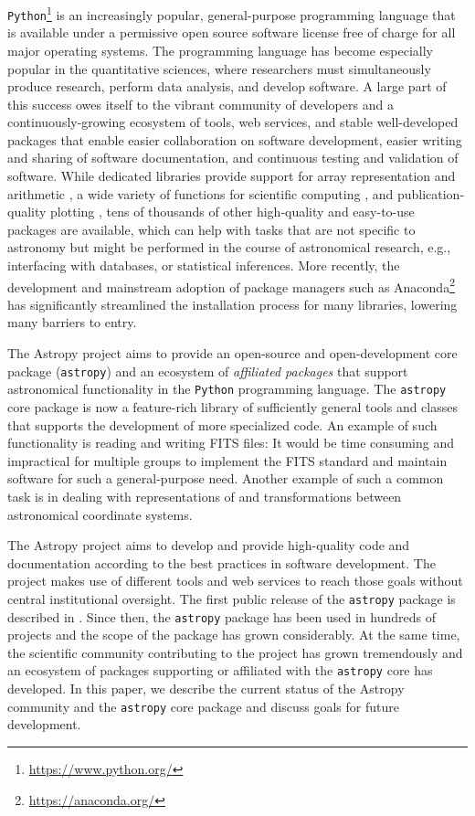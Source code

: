 \documentclass[modern]{aastex61}
\newcommand{\package}[1]{\texttt{#1}\xspace}
\newcommand{\python}{\package{Python}}
\newcommand{\astropy}{Astropy\xspace}
\newcommand{\astropypkg}{\package{astropy}}
\begin{document}
\python\footnote{\url{https://www.python.org/}} is an increasingly popular, general-purpose
programming language that is available under a permissive open source software license free of
charge for all major operating systems. The programming language has become especially popular
in the quantitative sciences, where researchers must simultaneously produce research, perform
data analysis, and develop software. A large part of this success owes itself to the vibrant
community of developers and a continuously-growing ecosystem of tools, web services, and stable
well-developed packages that enable easier collaboration on software development, easier
writing and sharing of software documentation, and continuous testing and validation of
software. While dedicated libraries provide support for array representation and
arithmetic \citep[\package{numpy};][]{numpy}, a wide variety of functions for scientific
computing \citep[\package{scipy};][]{scipy}, and publication-quality plotting
\citep[\package{matplotlib};][]{matplotlib}, tens of thousands of other high-quality and easy-to-use
packages are available, which can help with tasks that are not specific to astronomy but
might be performed in the course of astronomical research, e.g., interfacing with
databases, or statistical inferences.
More recently, the development and mainstream adoption of package managers such
as Anaconda\footnote{\url{https://anaconda.org/}} has significantly streamlined
the installation process for many libraries, lowering many barriers to entry.

The \astropy project aims to provide an open-source and open-development core
package (\astropypkg) and an ecosystem of \emph{affiliated packages} that
support astronomical functionality in the \python programming language.
The \astropypkg core package is now a feature-rich library of sufficiently
general tools and classes that supports the development of more specialized
code. An example of such functionality is reading and writing FITS files: It would be
time consuming and impractical for multiple groups to implement the FITS
standard \citep{FITS} and maintain software for such a general-purpose need.
Another example of such a common task is in dealing with representations of and
transformations between astronomical coordinate systems.

The \astropy project aims to develop and provide high-quality code and
documentation according to the best practices in software development.
The project makes use of different tools and web services to reach those
goals without central institutional oversight.
The first public release of the \astropypkg package is described in
\cite{astropy}. Since then, the \astropypkg package has been
used in hundreds of projects and the scope of the package has grown
considerably. At the same time, the scientific community
contributing to the project has grown tremendously and an ecosystem
of packages supporting or affiliated with the \astropypkg core has
developed.
In this paper, we describe the current status of the \astropy community and the
\astropypkg core package and discuss goals for future development.
\end{document}
